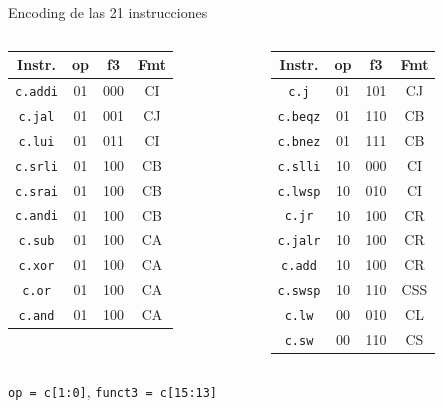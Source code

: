 \documentclass{beamer}
\begin{document}
\begin{frame}[fragile]{Encoding de las 21 instrucciones}
  \vfill
  \renewcommand{\arraystretch}{1.2}
  \small
  \centering
  \begin{columns}[T]
    \centering
    \begin{tabular}{@{}cccc@{}}
      \toprule
      \textbf{Instr.} & \textbf{op} & \textbf{f3} & \textbf{Fmt} \\
      \midrule
      \texttt{c.addi} & 01 & 000 & CI \\
      \texttt{c.jal}  & 01 & 001 & CJ \\
      \texttt{c.lui}  & 01 & 011 & CI \\
      \texttt{c.srli} & 01 & 100 & CB \\
      \texttt{c.srai} & 01 & 100 & CB \\
      \texttt{c.andi} & 01 & 100 & CB \\
      \texttt{c.sub}  & 01 & 100 & CA \\
      \texttt{c.xor}  & 01 & 100 & CA \\
      \texttt{c.or}   & 01 & 100 & CA \\
      \texttt{c.and}  & 01 & 100 & CA \\
      \bottomrule
    \end{tabular}
    \centering
    \begin{tabular}{@{}cccc@{}}
      \toprule
      \textbf{Instr.} & \textbf{op} & \textbf{f3} & \textbf{Fmt} \\
      \midrule
      \texttt{c.j}    & 01 & 101 & CJ \\
      \texttt{c.beqz} & 01 & 110 & CB \\
      \texttt{c.bnez} & 01 & 111 & CB \\
      \texttt{c.slli} & 10 & 000 & CI \\
      \texttt{c.lwsp} & 10 & 010 & CI \\
      \texttt{c.jr}   & 10 & 100 & CR \\
      \texttt{c.jalr} & 10 & 100 & CR \\
      \texttt{c.add}  & 10 & 100 & CR \\
      \texttt{c.swsp} & 10 & 110 & CSS \\
      \texttt{c.lw}   & 00 & 010 & CL \\
      \texttt{c.sw}   & 00 & 110 & CS \\
      \bottomrule
    \end{tabular}
  \end{columns}
  \vspace{4mm}
  \texttt{op = c[1:0]}, \texttt{funct3 = c[15:13]}
  \vfill
\end{frame}
\end{document}

